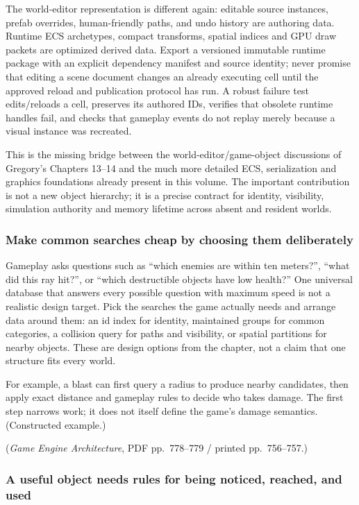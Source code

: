 The world-editor representation is different again: editable source instances, prefab overrides, human-friendly paths, and undo history are authoring data. Runtime ECS archetypes, compact transforms, spatial indices and GPU draw packets are optimized derived data. Export a versioned immutable runtime package with an explicit dependency manifest and source identity; never promise that editing a scene document changes an already executing cell until the approved reload and publication protocol has run. A robust failure test edits/reloads a cell, preserves its authored IDs, verifies that obsolete runtime handles fail, and checks that gameplay events do not replay merely because a visual instance was recreated.

This is the missing bridge between the world-editor/game-object discussions of Gregory's Chapters 13--14 and the much more detailed ECS, serialization and graphics foundations already present in this volume. The important contribution is not a new object hierarchy; it is a precise contract for identity, visibility, simulation authority and memory lifetime across absent and resident worlds.

\subsubsection{Make common searches cheap by choosing them deliberately}\label{make-common-searches-cheap-by-choosing-them-deliberately}

Gameplay asks questions such as ``which enemies are within ten meters?'', ``what did this ray hit?'', or ``which destructible objects have low health?'' One universal database that answers every possible question with maximum speed is not a realistic design target. Pick the searches the game actually needs and arrange data around them: an id index for identity, maintained groups for common categories, a collision query for paths and visibility, or spatial partitions for nearby objects. These are design options from the chapter, not a claim that one structure fits every world.

For example, a blast can first query a radius to produce nearby candidates, then apply exact distance and gameplay rules to decide who takes damage. The first step narrows work; it does not itself define the game's damage semantics. (Constructed example.)

(\emph{Game Engine Architecture}, PDF pp.~778--779 / printed pp.~756--757.)

\subsubsection{A useful object needs rules for being noticed, reached, and used}\label{a-useful-object-needs-rules-for-being-noticed-reached-and-used}

